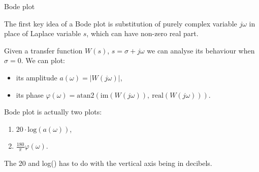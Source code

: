 \documentclass{beamer}
\begin{document}
\begin{frame}{Bode plot}
\begin{flushleft}

The first key idea of a Bode plot is substitution of purely complex variable $j \omega$ in place of Laplace variable $s$, which can have non-zero real part.

\bigskip

Given a transfer function $W(s)$, $s = \sigma + j \omega$ we can analyse its behaviour when $\sigma = 0$. We can plot:

\begin{itemize}
	\item  its amplitude $a(\omega) = \left| W(j \omega) \right|$,
	
	\item its phase $\varphi(\omega) = \text{atan2}( \text{im}(W(j \omega)), \ \text{real}(W(j \omega))  )$.
\end{itemize}


\bigskip
 
Bode plot is actually two plots: 

\begin{enumerate}
	\item  $20 \cdot \text{log}(a(\omega))$,
	
	\item $\frac{180}{\pi} \varphi(\omega)$.
\end{enumerate}

The 20 and log() has to do with the vertical axis being in decibels. 

\end{flushleft}
\end{frame}
\end{document}
